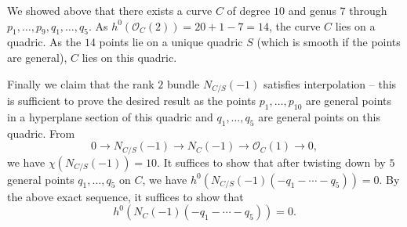 \documentclass[11pt]{amsart}
\renewcommand{\O}{\mathcal{O}}
\theoremstyle{definition}
\theoremstyle{remark}
\begin{document}
We showed above that there exists a curve $C$ of degree $10$ and genus $7$ through $p_1, \ldots, p_9, q_1, \ldots, q_5$.  As $h^0(\O_C(2)) = 20+1-7 = 14$, the curve $C$ lies on a quadric.  As the $14$ points lie on a unique quadric $S$ (which is smooth if the points are general), $C$ lies on this quadric.

Finally we claim that the rank $2$ bundle $N_{C/S}(-1)$ satisfies interpolation -- this is sufficient to prove the desired result as the points $p_1, \ldots, p_{10}$ are general points in a hyperplane section of this quadric
and $q_1, \ldots, q_5$ are general points on this quadric.  From
\[0 \to N_{C/S}(-1) \to N_C(-1) \to \O_C(1) \to 0, \]
we have $\chi(N_{C/S}(-1)) = 10$.  It suffices to show that after twisting down by $5$ general points $q_1, \ldots, q_5$ on $C$, we have $h^0(N_{C/S}(-1)(-q_1- \cdots-q_5)) = 0$.  By the above exact sequence, it suffices to show that
\begin{equation}\label{10_7_vanishing} h^0(N_{C}(-1)(-q_1-\cdots-q_5)) = 0.\end{equation}
\end{document}
